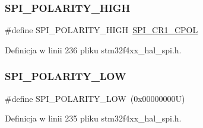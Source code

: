 \subsubsection{\texorpdfstring{S\+P\+I\+\_\+\+P\+O\+L\+A\+R\+I\+T\+Y\+\_\+\+H\+I\+GH}{SPI\_POLARITY\_HIGH}}
{\footnotesize\ttfamily \#define S\+P\+I\+\_\+\+P\+O\+L\+A\+R\+I\+T\+Y\+\_\+\+H\+I\+GH~\hyperlink{group___peripheral___registers___bits___definition_ga2616a10f5118cdc68fbdf0582481e124}{S\+P\+I\+\_\+\+C\+R1\+\_\+\+C\+P\+OL}}



Definicja w linii 236 pliku stm32f4xx\+\_\+hal\+\_\+spi.\+h.

\mbox{\label{group___s_p_i___clock___polarity_gaf61e3c6ec671baef099516265793c8df}} 
\subsubsection{\texorpdfstring{S\+P\+I\+\_\+\+P\+O\+L\+A\+R\+I\+T\+Y\+\_\+\+L\+OW}{SPI\_POLARITY\_LOW}}
{\footnotesize\ttfamily \#define S\+P\+I\+\_\+\+P\+O\+L\+A\+R\+I\+T\+Y\+\_\+\+L\+OW~(0x00000000\+U)}



Definicja w linii 235 pliku stm32f4xx\+\_\+hal\+\_\+spi.\+h.

